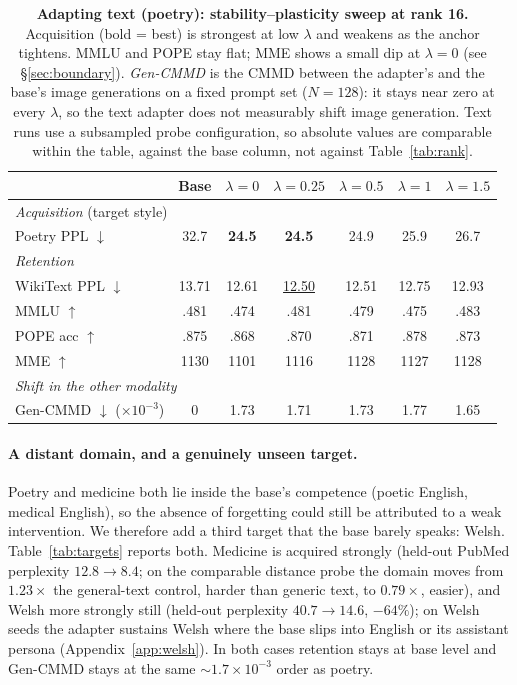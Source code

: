\documentclass{article}
\begin{document}
\begin{table}[t]
\caption{\textbf{Adapting text (poetry): stability--plasticity sweep at rank
16.} Acquisition (bold = best) is strongest at low $\lambda$ and weakens as the
anchor tightens. MMLU and POPE stay flat; MME shows a small dip at $\lambda=0$
(see \S\ref{sec:boundary}). \emph{Gen-CMMD} is the CMMD between the adapter's
and the base's image generations on a fixed prompt set ($N{=}128$): it stays
near zero at every $\lambda$, so the text adapter does not measurably shift
image generation. Text runs use a subsampled probe configuration, so absolute
values are comparable within the table, against the base column, not against
Table~\ref{tab:rank}.}
\label{tab:textkl}
\centering\small
\begin{tabular}{lcccccc}
\toprule
& Base & $\lambda{=}0$ & $\lambda{=}0.25$ & $\lambda{=}0.5$ & $\lambda{=}1$ & $\lambda{=}1.5$ \\
\midrule
\multicolumn{7}{l}{\emph{Acquisition} (target style)}\\
Poetry PPL $\downarrow$ & 32.7 & \textbf{24.5} & \textbf{24.5} & 24.9 & 25.9 & 26.7 \\
\midrule
\multicolumn{7}{l}{\emph{Retention}}\\
WikiText PPL $\downarrow$ & 13.71 & 12.61 & \underline{12.50} & 12.51 & 12.75 & 12.93 \\
MMLU $\uparrow$           & .481 & .474 & .481 & .479 & .475 & .483 \\
POPE acc $\uparrow$       & .875 & .868 & .870 & .871 & .878 & .873 \\
MME $\uparrow$            & 1130 & 1101 & 1116 & 1128 & 1127 & 1128 \\
\midrule
\multicolumn{7}{l}{\emph{Shift in the other modality}}\\
Gen-CMMD $\downarrow$ ($\times10^{-3}$) & 0 & 1.73 & 1.71 & 1.73 & 1.77 & 1.65 \\
\bottomrule
\end{tabular}
\end{table}

\paragraph{A distant domain, and a genuinely unseen target.}
Poetry and medicine both lie inside the base's competence (poetic English,
medical English), so the absence of forgetting could still be attributed to a
weak intervention. We therefore add a third target that the base barely speaks:
Welsh. Table~\ref{tab:targets} reports both. Medicine is acquired strongly
(held-out PubMed perplexity $12.8\to8.4$; on the comparable distance probe the
domain moves from $1.23\times$ the general-text control, harder than generic
text, to $0.79\times$, easier), and Welsh more strongly still (held-out
perplexity $40.7\to14.6$, $-64\%$); on Welsh seeds the adapter sustains Welsh
where the base slips into English or its assistant persona
(Appendix~\ref{app:welsh}). In both cases retention stays at base level and
Gen-CMMD stays at the same $\sim\!1.7\times10^{-3}$ order as poetry.
\end{document}
